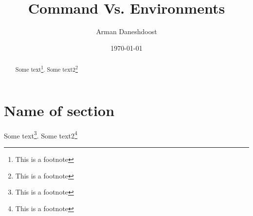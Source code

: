 \documentclass{article}
\title{Command Vs. Environments}
\author{Arman Daneshdoost}
\date{\today}
\begin{document}
\maketitle

\begin{abstract} %
Some text\footnote{This is a footnote}. Some text2\footnote[3]{This is a footnote}
\end{abstract}

\section{Name of section}
Some text\footnote{This is a footnote}. Some text2\footnote[3]{This is a footnote} %
\end{document}

